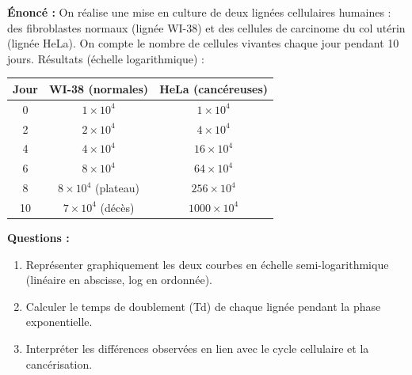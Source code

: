 \documentclass[11pt]{article}
\begin{document}
\begin{exoresolu}
\textbf{Énoncé :} On réalise une mise en culture de deux lignées cellulaires humaines : des fibroblastes normaux (lignée WI-38) et des cellules de carcinome du col utérin (lignée HeLa). On compte le nombre de cellules vivantes chaque jour pendant 10 jours. Résultats (échelle logarithmique) :
\begin{center}
\begin{tabular}{|c|c|c|}\hline
\rowcolor{popblueL} \textbf{Jour} & \textbf{WI-38 (normales)} & \textbf{HeLa (cancéreuses)} \\ \hline
0 & $1 \times 10^4$ & $1 \times 10^4$ \\ \hline
2 & $2 \times 10^4$ & $4 \times 10^4$ \\ \hline
4 & $4 \times 10^4$ & $16 \times 10^4$ \\ \hline
6 & $8 \times 10^4$ & $64 \times 10^4$ \\ \hline
8 & $8 \times 10^4$ (plateau) & $256 \times 10^4$ \\ \hline
10 & $7 \times 10^4$ (décès) & $1000 \times 10^4$ \\ \hline
\end{tabular}
\end{center}
\textbf{Questions :}
\begin{enumerate}
    \item Représenter graphiquement les deux courbes en échelle semi-logarithmique (linéaire en abscisse, log en ordonnée).
    \item Calculer le temps de doublement (Td) de chaque lignée pendant la phase exponentielle.
    \item Interpréter les différences observées en lien avec le cycle cellulaire et la cancérisation.
\end{enumerate}


\end{exoresolu}
\end{document}
